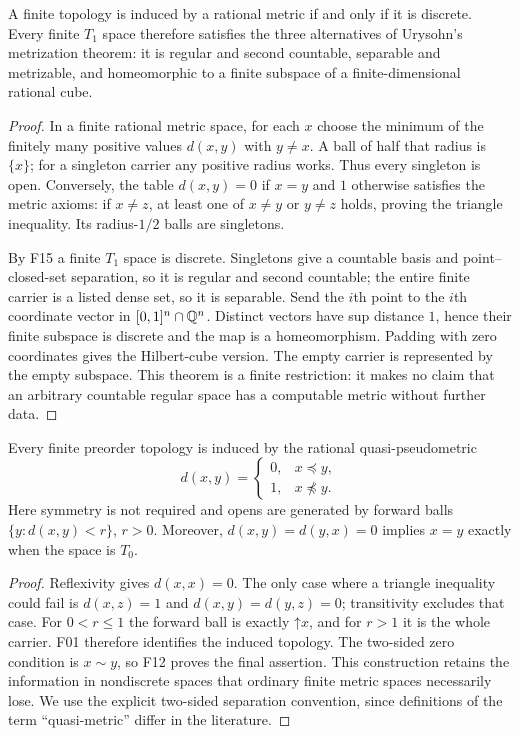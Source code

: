 \begin{theorem}\label{thm:finite-metric}
A finite topology is induced by a rational metric if and only if
it is discrete.  Every finite $T_1$ space therefore satisfies the
three alternatives of Urysohn's metrization theorem: it is regular
and second countable, separable and metrizable, and homeomorphic
to a finite subspace of a finite-dimensional rational cube.
\end{theorem}
\begin{proof}
In a finite rational metric space, for each $x$ choose the minimum
of the finitely many positive values $d(x,y)$ with $y\ne x$.
A ball of half that radius is $\{x\}$; for a singleton carrier
any positive radius works.  Thus every singleton is open.
Conversely, the table $d(x,y)=0$ if $x=y$ and $1$ otherwise
satisfies the metric axioms: if $x\ne z$, at least one of
$x\ne y$ or $y\ne z$ holds, proving the triangle inequality.
Its radius-$1/2$ balls are singletons.

By F15 a finite $T_1$ space is discrete.  Singletons give a
countable basis and point--closed-set separation, so it is
regular and second countable; the entire finite carrier is a
listed dense set, so it is separable.  Send the $i$th point to
the $i$th coordinate vector in $[0,1]^n\cap\mathbb Q^n$.  Distinct
vectors have sup distance $1$, hence their finite subspace is
discrete and the map is a homeomorphism.  Padding with zero
coordinates gives the Hilbert-cube version.  The empty carrier
is represented by the empty subspace.  This theorem is a finite
restriction: it makes no claim that an arbitrary countable
regular space has a computable metric without further data.
\end{proof}

\begin{theorem}\label{thm:finite-quasi}
Every finite preorder topology is induced by the rational
quasi-pseudometric
\[
 d(x,y)=\begin{cases}0,&x\preceq y,\\1,&x\not\preceq y.\end{cases}
\]
Here symmetry is not required and opens are generated by forward
balls $\{y:d(x,y)<r\}$, $r>0$.  Moreover,
$d(x,y)=d(y,x)=0$ implies $x=y$ exactly when the space is $T_0$.
\end{theorem}
\begin{proof}
Reflexivity gives $d(x,x)=0$.  The only case where a triangle
inequality could fail is $d(x,z)=1$ and
$d(x,y)=d(y,z)=0$; transitivity excludes that case.
For $0<r\leq1$ the forward ball is exactly
$\mathord\uparrow x$, and for $r>1$ it is the whole carrier.
F01 therefore identifies the induced topology.  The two-sided
zero condition is $x\sim y$, so F12 proves the final assertion.
This construction retains the information in nondiscrete spaces
that ordinary finite metric spaces necessarily lose.  We use the
explicit two-sided separation convention, since definitions of
the term ``quasi-metric'' differ in the literature.
\end{proof}

